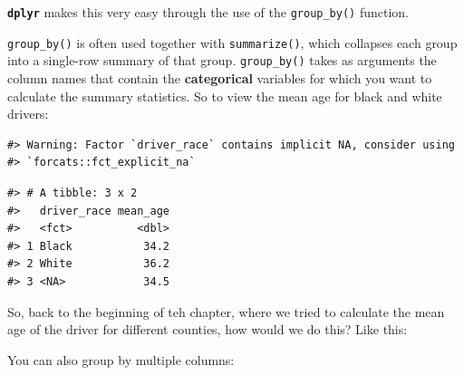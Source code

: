 \documentclass[]{book}
\newenvironment{Shaded}{\begin{snugshade}}{\end{snugshade}}
\newcommand{\DataTypeTok}[1]{\textcolor[rgb]{0.13,0.29,0.53}{#1}}
\newcommand{\KeywordTok}[1]{\textcolor[rgb]{0.13,0.29,0.53}{\textbf{#1}}}
\newcommand{\NormalTok}[1]{#1}
\newcommand{\OperatorTok}[1]{\textcolor[rgb]{0.81,0.36,0.00}{\textbf{#1}}}
\newcommand{\OtherTok}[1]{\textcolor[rgb]{0.56,0.35,0.01}{#1}}
\newcommand{\StringTok}[1]{\textcolor[rgb]{0.31,0.60,0.02}{#1}}
\begin{document}
\textbf{\texttt{dplyr}} makes this very easy through the use of the
\texttt{group\_by()} function.

\texttt{group\_by()} is often used together with \texttt{summarize()}, which collapses each
group into a single-row summary of that group. \texttt{group\_by()} takes as arguments
the column names that contain the \textbf{categorical} variables for which you want
to calculate the summary statistics. So to view the mean age for black and white drivers:

\begin{Shaded}
\end{Shaded}

\begin{verbatim}
#> Warning: Factor `driver_race` contains implicit NA, consider using
#> `forcats::fct_explicit_na`
\end{verbatim}

\begin{verbatim}
#> # A tibble: 3 x 2
#>   driver_race mean_age
#>   <fct>          <dbl>
#> 1 Black           34.2
#> 2 White           36.2
#> 3 <NA>            34.5
\end{verbatim}

So, back to the beginning of teh chapter, where we tried to calculate the mean age of the driver for different counties, how would we do this? Like this:

\begin{Shaded}
\end{Shaded}

You can also group by multiple columns:

\begin{Shaded}
\end{Shaded}
\end{document}
